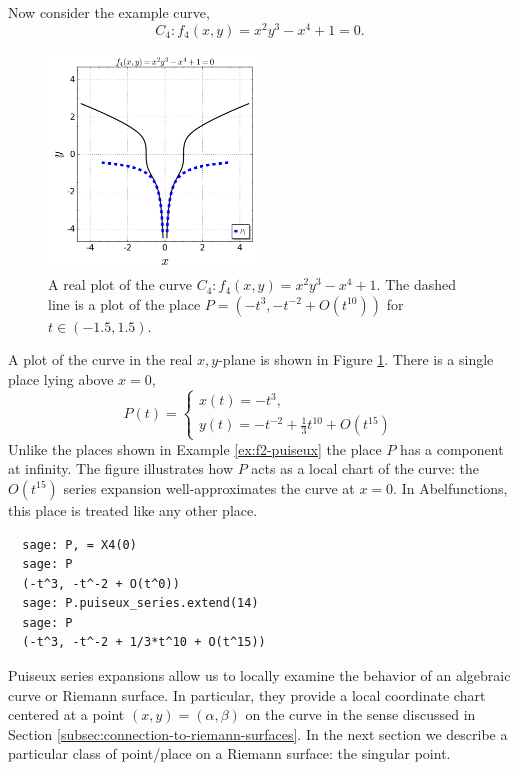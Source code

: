 \begin{example}
  Now consider the example curve,
  \[
    C_4 :  f_4(x,y) = x^2y^3 - x^4 + 1 = 0.
  \]
  \begin{figure}
  \centering
  \includegraphics[width=0.49\textwidth]{images/f4-puiseux.png}
  \caption{A real plot of the curve $C_4: f_4(x,y) = x^2y^3 - x^4 + 1$. The
    dashed line is a plot of the place $P = \left(-t^3, -t^{-2} +
       O(t^{10})\right)$ for $t \in (-1.5, 1.5)$.}
  \label{fig:f4-puiseux}
  \end{figure}
  A plot of the curve in the real $x,y$-plane is shown in Figure
  \ref{fig:f4-puiseux}. There is a single place lying above $x=0$,
  \begin{equation}
    P(t) = \begin{cases}
      x(t) = -t^3, \\
      y(t) = -t^{-2} + \tfrac{1}{3}t^{10} + O(t^{15})
    \end{cases}
  \end{equation}
  Unlike the places shown in Example \ref{ex:f2-puiseux} the place $P$ has a
  component at infinity. The figure illustrates how $P$ acts as a local chart of
  the curve: the $O(t^{15})$ series expansion well-approximates the curve at
  $x=0$. In Abelfunctions, this place is treated like any other place.
  \begin{lstlisting}
  sage: P, = X4(0)
  sage: P  
  (-t^3, -t^-2 + O(t^0))
  sage: P.puiseux_series.extend(14)
  sage: P
  (-t^3, -t^-2 + 1/3*t^10 + O(t^15))
  \end{lstlisting}
\end{example}

Puiseux series expansions allow us to locally examine the behavior of an
algebraic curve or Riemann surface. In particular, they provide a local
coordinate chart centered at a point $(x,y) = (\alpha,\beta)$ on the curve in
the sense discussed in Section \ref{subsec:connection-to-riemann-surfaces}. In
the next section we describe a particular class of point/place on a Riemann
surface: the singular point.



